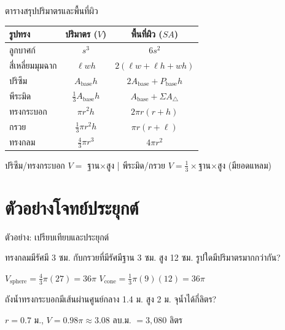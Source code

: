 \documentclass[11pt, aspectratio=169]{beamer}
\begin{document}
\begin{frame}{ตารางสรุปปริมาตรและพื้นที่ผิว}
  \begin{center}
    \renewcommand{\arraystretch}{1.4}
    \small
    \begin{tabular}{l|c|c}
      \textbf{รูปทรง} & \textbf{ปริมาตร ($V$)} & \textbf{พื้นที่ผิว ($SA$)} \\
      \hline
      ลูกบาศก์ & $s^3$ & $6s^2$ \\
      สี่เหลี่ยมมุมฉาก & $\ell w h$ & $2(\ell w + \ell h + wh)$ \\
      ปริซึม & $A_{\text{base}} h$ & $2A_{\text{base}} + P_{\text{base}}h$ \\
      พีระมิด & $\frac{1}{3}A_{\text{base}}h$ & $A_{\text{base}} + \Sigma A_{\triangle}$ \\
      ทรงกระบอก & $\pi r^2 h$ & $2\pi r(r+h)$ \\
      กรวย & $\frac{1}{3}\pi r^2 h$ & $\pi r(r+\ell)$ \\
      ทรงกลม & $\frac{4}{3}\pi r^3$ & $4\pi r^2$ \\
    \end{tabular}
    \normalsize
  \end{center}

  \begin{intuition}[จำง่าย ๆ]
    ปริซึม/ทรงกระบอก $V =$ ฐาน$\times$สูง \quad|\quad
    พีระมิด/กรวย $V = \frac{1}{3}\times$ฐาน$\times$สูง (มียอดแหลม)
  \end{intuition}
\end{frame}

\section{ตัวอย่างโจทย์ประยุกต์}

\begin{frame}{ตัวอย่าง: เปรียบเทียบและประยุกต์}
  \begin{exambox}[โจทย์ 1]
    ทรงกลมมีรัศมี 3 ซม. กับกรวยที่มีรัศมีฐาน 3 ซม. สูง 12 ซม.
    รูปใดมีปริมาตรมากกว่ากัน?
  \end{exambox}

  \begin{solbox}[วิธีทำ]
    $V_{\text{sphere}} = \frac{4}{3}\pi (27) = 36\pi$ \quad
    $V_{\text{cone}} = \frac{1}{3}\pi (9)(12) = 36\pi$

  \end{solbox}

  \begin{exambox}[โจทย์ 2]
    ถังนํ้าทรงกระบอกมีเส้นผ่านศูนย์กลาง 1.4 ม. สูง 2 ม. จุนํ้าได้กี่ลิตร?
  \end{exambox}

  \begin{solbox}[วิธีทำ]
    $r = 0.7$ ม., $V = 0.98\pi \approx 3.08$ ลบ.ม. $= 3{,}080$ ลิตร
  \end{solbox}
\end{frame}
\end{document}
